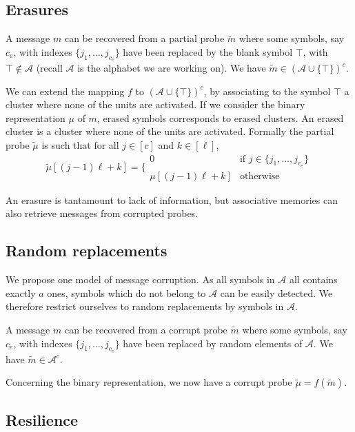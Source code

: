 \documentclass[english,10pt,twocolumn]{IEEEtran}
\theoremstyle{definition}
\begin{document}
	\subsection{Erasures}
	
	A message $m$ can be recovered from a partial probe $\tilde{m}$ where some symbols, say $c_e$, with indexes $\{j_1, \dots , j_{c_e} \}$ have been replaced by the blank symbol $\intercal$, with $\intercal \not\in\mathcal{A}$ (recall $\mathcal{A}$ is the alphabet we are working on).  We have $\tilde{m} \in \left( \mathcal{A} \cup \{ \intercal \}\right)^c$.
	
	We can extend the mapping $f$ to $\left( \mathcal{A} \cup \{ \intercal \}\right)^c$, by associating to the symbol $\intercal$ a cluster where none of the units are activated. If we consider the binary representation $\mu$ of $m$, erased symbols corresponds to erased clusters. An erased cluster is a cluster where none of the units are activated. Formally the partial probe $\tilde{\mu}$ is such that for all $j\in [c]$ and $k \in [\ell ]$, \[ 
		\tilde{\mu}[(j-1)\ell+k] = \bigg \{ \begin{array}{cl} 0 & \mbox{if } j\in \{j_1, \dots , j_{c_e} \}\\
													\mu[(j-1)\ell+k] & \mbox{otherwise}	
	\end{array}\]
	
	
	An erasure is tantamount to lack of information, but associative memories can also retrieve messages from corrupted probes.
	
	\subsection{Random replacements}
	
	We propose one model of message corruption. As all symbols in $\mathcal{A}$ all contains exactly $a$ ones, symbols which do not belong to $\mathcal{A}$ can be easily detected. We therefore restrict ourselves to random replacements by symbols in $\mathcal{A}$.
	
	A message $m$ can be recovered from a corrupt probe $\tilde{m}$ where some symbols, say $c_e$, with indexes $\{j_1, \dots , j_{c_e} \}$ have been replaced by random elements of $\mathcal{A}$. We have $\tilde{m} \in \mathcal{A}^c$.
	
	Concerning the binary representation, we now have a corrupt probe $\tilde{\mu} = f(\tilde{m})$.
	
	
		
	\subsection{Resilience}
	
\end{document}
